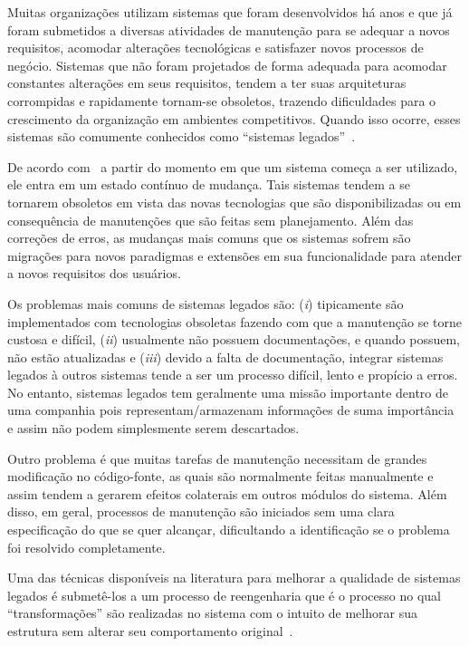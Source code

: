
Muitas organizações utilizam sistemas que foram desenvolvidos há anos e que já foram submetidos a diversas atividades de manutenção para se adequar a novos requisitos, acomodar alterações tecnológicas e satisfazer novos processos de negócio. Sistemas que não foram projetados de forma adequada para acomodar constantes alterações em seus requisitos, tendem a ter suas arquiteturas corrompidas e rapidamente tornam-se obsoletos, trazendo dificuldades para o crescimento da organização em ambientes competitivos. Quando isso ocorre, esses sistemas são comumente conhecidos como ``sistemas legados''~\cite{Griffith2011}. 

De acordo com~\citet{Fokaefs2012} a partir do momento em que um sistema começa a ser utilizado, ele entra em um estado contínuo de mudança. Tais sistemas tendem a se tornarem obsoletos em vista das novas tecnologias que são disponibilizadas ou em consequência de manutenções que são feitas sem planejamento. Além das correções de erros, as mudanças mais comuns que os sistemas sofrem são migrações para novos paradigmas e extensões em sua funcionalidade para atender a novos requisitos dos usuários. 

Os problemas mais comuns de sistemas legados são: (\textit{i}) tipicamente são implementados com tecnologias obsoletas fazendo com que a manutenção se torne custosa e difícil, (\textit{ii}) usualmente não possuem documentações, e quando possuem, não estão atualizadas e (\textit{iii}) devido a falta de documentação, integrar sistemas legados à outros sistemas tende a ser um processo difícil, lento e propício a erros. No entanto, sistemas legados tem geralmente uma missão importante dentro de uma companhia pois representam/armazenam informações de suma importância e assim não podem simplesmente serem descartados.


Outro problema é que muitas tarefas de manutenção necessitam de grandes modificação no código-fonte, as quais são normalmente feitas manualmente e assim tendem a gerarem efeitos colaterais em outros módulos do sistema. Além disso, em geral, processos de manutenção são iniciados sem uma clara especificação do que se quer alcançar, dificultando a identificação se o problema foi resolvido completamente.



Uma das técnicas disponíveis na literatura para melhorar a qualidade de sistemas legados é submetê-los a um processo de reengenharia que é o processo no qual ``transformações'' são realizadas no sistema com o intuito de melhorar sua estrutura sem alterar seu comportamento original~\cite{refactImpro}.  


